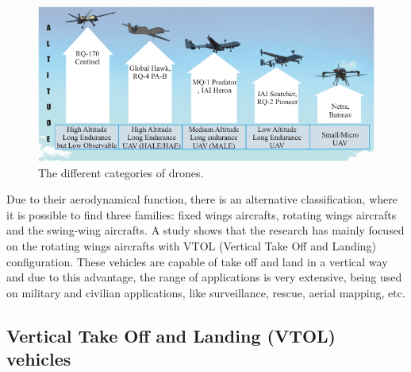 \begin{figure}[H]
    \centering
    \includegraphics[width =\textwidth]{figures/categories.png}
    \caption{The different categories of drones.}
    \label{fig:categories}
  \end{figure}

Due to their aerodynamical function, there is an alternative classification, where it is possible to find three families: fixed wings aircrafts, rotating wings aircrafts and the swing-wing aircrafts. A study shows that the research has mainly focused on the rotating wings aircrafts with VTOL (Vertical Take Off and Landing) configuration. These vehicles are capable of take off and land in a vertical way and due to this advantage, the range of applications is very extensive, being used on military and civilian applications, like surveillance, rescue, aerial mapping, etc.

 \subsection{Vertical Take Off and Landing (VTOL) vehicles}
